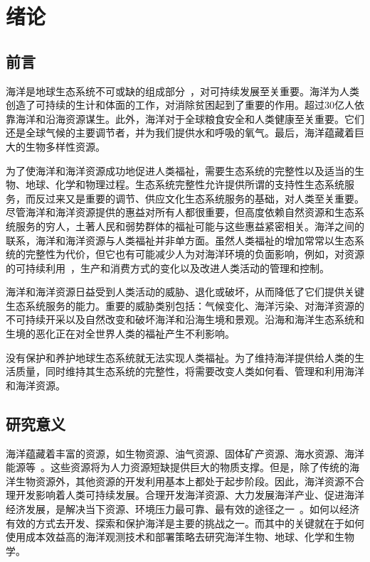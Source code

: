 \chapter{绪论}

\section{前言}
海洋是地球生态系统不可或缺的组成部分~\cite{王晓红2003人类活动对海洋生物多样性的影响}，对可持续发展至关重要。海洋为人类创造了可持续的生计和体面的工作，对消除贫困起到了重要的作用。超过30亿人依靠海洋和沿海资源谋生。此外，海洋对于全球粮食安全和人类健康至关重要。它们还是全球气候的主要调节者，并为我们提供水和呼吸的氧气。最后，海洋蕴藏着巨大的生物多样性资源。

为了使海洋和海洋资源成功地促进人类福祉，需要生态系统的完整性以及适当的生物、地球、化学和物理过程。生态系统完整性允许提供所谓的支持性生态系统服务，而反过来又是重要的调节、供应文化生态系统服务的基础，对人类至关重要。尽管海洋和海洋资源提供的惠益对所有人都很重要，但高度依赖自然资源和生态系统服务的穷人，土著人民和弱势群体的福祉可能与这些惠益紧密相关。海洋之间的联系，海洋和海洋资源与人类福祉并非单方面。虽然人类福祉的增加常常以生态系统的完整性为代价，但它也有可能减少人为对海洋环境的负面影响，例如，对资源的可持续利用~\cite{孙富行2000资源水利与水资源可持续发展}，生产和消费方式的变化以及改进人类活动的管理和控制。

海洋和海洋资源日益受到人类活动的威胁、退化或破坏，从而降低了它们提供关键生态系统服务的能力。重要的威胁类别包括：气候变化、海洋污染、对海洋资源的不可持续开采以及自然改变和破坏海洋和沿海生境和景观。沿海和海洋生态系统和生境的恶化正在对全世界人类的福祉产生不利影响。

没有保护和养护地球生态系统就无法实现人类福祉。为了维持海洋提供给人类的生活质量，同时维持其生态系统的完整性，将需要改变人类如何看、管理和利用海洋和海洋资源。

\section{研究意义}
海洋蕴藏着丰富的资源，如生物资源、油气资源、固体矿产资源、海水资源、海洋能源等~\cite{张耀光2006中国海洋经济与可持续发展}。这些资源将为人力资源短缺提供巨大的物质支撑。但是，除了传统的海洋生物资源外，其他资源的开发利用基本上都处于起步阶段。因此，海洋资源不合理开发影响着人类可持续发展。合理开发海洋资源、大力发展海洋产业、促进海洋经济发展，是解决当下资源、环境压力最可靠、最有效的途径之一~\cite{2016xcc}。如何以经济有效的方式去开发、探索和保护海洋是主要的挑战之一。而其中的关键就在于如何使用成本效益高的海洋观测技术和部署策略去研究海洋生物、地球、化学和生物学。

